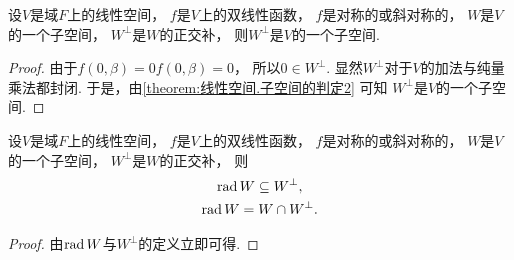 \begin{proposition}
设\(V\)是域\(F\)上的线性空间，
\(f\)是\(V\)上的双线性函数，
\(f\)是对称的或斜对称的，
\(W\)是\(V\)的一个子空间，
\(W^\perp\)是\(W\)的正交补，
则\(W^\perp\)是\(V\)的一个子空间.
\begin{proof}
由于\(f(0,\beta) = 0 f(0,\beta) = 0\)，
所以\(0 \in W^\perp\).
显然\(W^\perp\)对于\(V\)的加法与纯量乘法都封闭.
于是，由\cref{theorem:线性空间.子空间的判定2} 可知
\(W^\perp\)是\(V\)的一个子空间.
\end{proof}
\end{proposition}

\begin{proposition}
设\(V\)是域\(F\)上的线性空间，
\(f\)是\(V\)上的双线性函数，
\(f\)是对称的或斜对称的，
\(W\)是\(V\)的一个子空间，
\(W^\perp\)是\(W\)的正交补，
则\begin{gather*}
	\operatorname{rad} W \subseteq W^\perp, \\
	\operatorname{rad} W = W \cap W^\perp.
\end{gather*}
\begin{proof}
由\(\operatorname{rad} W\)与\(W^\perp\)的定义立即可得.
\end{proof}
\end{proposition}

